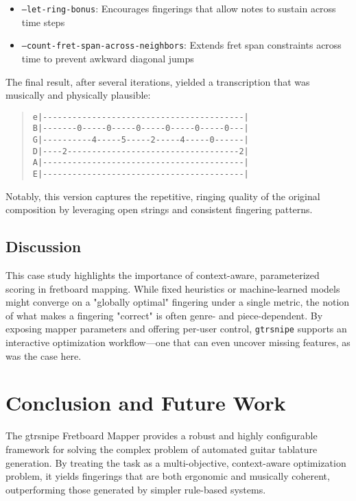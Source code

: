\documentclass[conference]{IEEEtran}
\begin{document}
\begin{itemize}
  \item \texttt{--let-ring-bonus}: Encourages fingerings that allow notes to sustain across time steps
  \item \texttt{--count-fret-span-across-neighbors}: Extends fret span constraints across time to prevent awkward diagonal jumps
\end{itemize}

The final result, after several iterations, yielded a transcription that was musically and physically plausible:

\begin{quote}\small
\begin{verbatim}
e|-----------------------------------------|
B|-------0-----0-----0-----0-----0-----0---|
G|----------4-----5-----2-----4-----0------|
D|----2-----------------------------------2|
A|-----------------------------------------|
E|-----------------------------------------|
\end{verbatim}
\end{quote}

Notably, this version captures the repetitive, ringing quality of the original composition by leveraging open strings and consistent fingering patterns.

\subsection{Discussion}

This case study highlights the importance of context-aware, parameterized scoring in fretboard mapping. While fixed heuristics or machine-learned models might converge on a "globally optimal" fingering under a single metric, the notion of what makes a fingering "correct" is often genre- and piece-dependent. By exposing mapper parameters and offering per-user control, \texttt{gtrsnipe} supports an interactive optimization workflow—one that can even uncover missing features, as was the case here.



\section{Conclusion and Future Work}

The gtrsnipe Fretboard Mapper provides a robust and highly configurable framework for solving the complex problem of automated guitar tablature generation. By treating the task as a multi-objective, context-aware optimization problem, it yields fingerings that are both ergonomic and musically coherent, outperforming those generated by simpler rule-based systems.
\end{document}
